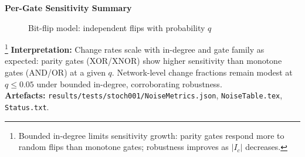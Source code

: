 \documentclass{article}
\begin{document}
\textbf{Per-Gate Sensitivity Summary}
\begin{figure}[h]
\centering
{}
\caption{Bit-flip model: independent flips with probability $q$}
\end{figure}
\footnote{Bounded in-degree limits sensitivity growth: parity gates respond more to random flips than monotone gates; robustness improves as $\lvert I_c\rvert$ decreases.}
\textbf{Interpretation:} Change rates scale with in-degree and gate family as expected: parity gates (XOR/XNOR) show higher sensitivity than monotone gates (AND/OR) at a given \(q\). Network-level change fractions remain modest at \(q\le 0.05\) under bounded in-degree, corroborating robustness.\\
\textbf{Artefacts:} \texttt{results/tests/stoch001/NoiseMetrics.json}, \texttt{NoiseTable.tex}, \texttt{Status.txt}.
\end{document}
